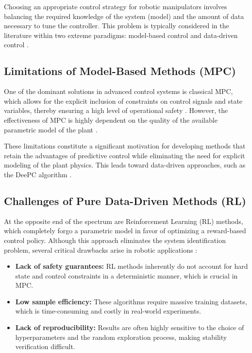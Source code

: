 Choosing an appropriate control strategy for robotic manipulators involves balancing the required knowledge of the system (model) and the amount of data necessary to tune the controller. This problem is typically considered in the literature within two extreme paradigms: model-based control and data-driven control \cite{deepc, tatiewski, quad, ethzurich}.

\subsection{Limitations of Model-Based Methods (MPC)}
One of the dominant solutions in advanced control systems is classical MPC, which allows for the explicit inclusion of constraints on control signals and state variables, thereby ensuring a high level of operational safety \cite{nmpc}. However, the effectiveness of MPC is highly dependent on the quality of the available parametric model of the plant \cite{ethzurich}.

These limitations constitute a significant motivation for developing methods that retain the advantages of predictive control while eliminating the need for explicit modeling of the plant physics. This leads toward data-driven approaches, such as the DeePC algorithm \cite{deepc}.

\subsection{Challenges of Pure Data-Driven Methods (RL)}
At the opposite end of the spectrum are Reinforcement Learning (RL) methods, which completely forgo a parametric model in favor of optimizing a reward-based control policy. Although this approach eliminates the system identification problem, several critical drawbacks arise in robotic applications \cite{deepc, ethzurich}:
\begin{itemize}
    \item \textbf{Lack of safety guarantees:} RL methods inherently do not account for hard state and control constraints in a deterministic manner, which is crucial in MPC.
    \item \textbf{Low sample efficiency:} These algorithms require massive training datasets, which is time-consuming and costly in real-world experiments.
    \item \textbf{Lack of reproducibility:} Results are often highly sensitive to the choice of hyperparameters and the random exploration process, making stability verification difficult.
\end{itemize}

